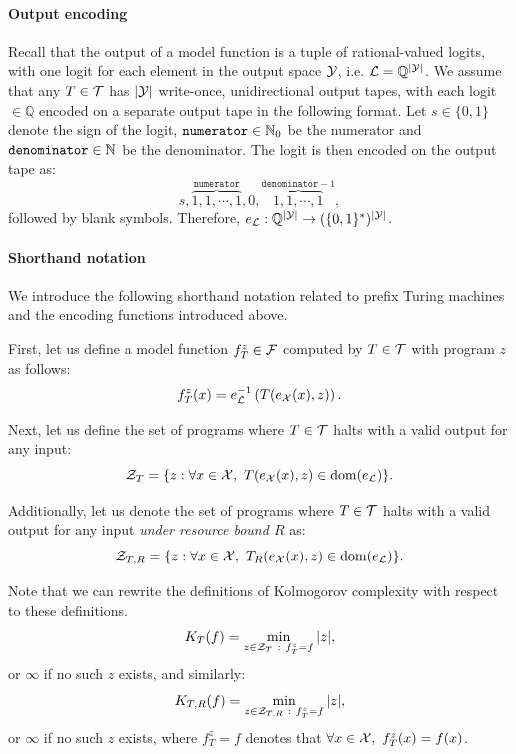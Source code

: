 \paragraph{Output encoding} Recall that the output of a model function is a tuple of rational-valued logits, with one logit for each element in the output space ${\mathcal{Y}}$, i.e. ${\mathcal{L}} = \mathbb{Q}^{|{\mathcal{Y}}|}$. We assume that any $T \in {\mathcal{T}}$ has $|{\mathcal{Y}}|$ write-once, unidirectional output tapes, with each logit $\in \mathbb{Q}$ encoded on a separate output tape in the following format. Let $s \in \{ 0,1 \}$ denote the sign of the logit, $\texttt{numerator} \in \mathbb{N}_0$ be the numerator and $\texttt{denominator} \in \mathbb{N}$ be the denominator. The logit is then encoded on the output tape as:
\begin{equation}
s, \overbrace{1, 1, \cdots, 1}^{\texttt{numerator}}, 0, \overbrace{1, 1, \cdots, 1}^{\texttt{denominator}-1},
\end{equation}
followed by blank symbols.
Therefore, $e_{\mathcal{L}} : \mathbb{Q}^{|{\mathcal{Y}}|} \rightarrow (\{0,1\}^*)^{|{\mathcal{Y}}|}$.

\paragraph{Shorthand notation} We introduce the following shorthand notation related to prefix Turing machines and the encoding functions introduced above.

First, let us define a model function $f_T^z \in {\mathcal{F}}$ computed by $T \in {\mathcal{T}}$ with program $z$ as follows:
\begin{equation}
    f_T^z(x) = e_{\mathcal{L}}^{-1}\left( T(e_{{\mathcal{X}}}(x),z) \right).
\end{equation}

Next, let us define the set of programs where $T \in {\mathcal{T}}$ halts with a valid output for any input:
\begin{equation}
    {\mathcal{Z}}_T = \{ z : \forall x \in {\mathcal{X}},~T(e_{\mathcal{X}}(x), z) \in \operatorname{dom}(e_{\mathcal{L}}) \}.
\end{equation}

Additionally, let us denote the set of programs where $T \in {\mathcal{T}}$ halts with a valid output for any input \emph{under resource bound $R$} as:
\begin{equation}
    {\mathcal{Z}}_{T,R} = \{ z : \forall x \in {\mathcal{X}},~T_R(e_{\mathcal{X}}(x), z) \in \operatorname{dom}(e_{\mathcal{L}}) \}.
\end{equation}

Note that we can rewrite the definitions of Kolmogorov complexity with respect to these definitions.
\begin{equation}
    K_T(f) = \min_{z \in {\mathcal{Z}}_T  ~:~ f_T^z = f} |z|,
\end{equation}
or $\infty$ if no such $z$ exists, and similarly: 
\begin{equation}
    K_{T,R}(f) = \min_{z \in {\mathcal{Z}}_{T,R}  ~:~ f_T^z = f} |z|,
\end{equation}
or $\infty$ if no such $z$ exists, where $f_T^z = f$ denotes that $\forall x \in {\mathcal{X}},~f_T^z(x) = f(x)$.

